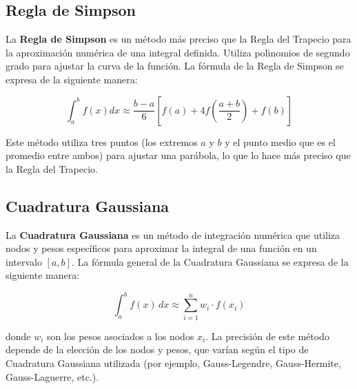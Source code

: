 \documentclass[a4paper]{article}
\begin{document}
    \subsection{Regla de Simpson}
    La \textbf{Regla de Simpson} es un método más preciso que la Regla del Trapecio para la 
    aproximación numérica de una integral definida. Utiliza polinomios de segundo grado para 
    ajustar la curva de la función. La fórmula de la Regla de Simpson se expresa de la siguiente 
    manera:
    
    \[
    \int_{a}^{b} f(x) dx \approx \frac{b-a}{6} \left[f(a) + 4f\left(\frac{a+b}{2}\right) + f(b)\right]
    \]
    
    \pagebreak
    
    Este método utiliza tres puntos (los extremos $a$ y $b$ y el punto medio que es el promedio entre ambos) para 
    ajustar una parábola, lo que lo hace más preciso que la Regla del Trapecio.\cite{srivastava2011}

    \begin{center}
    
    \end{center}

    \subsection{Cuadratura Gaussiana}
    
    La \textbf{Cuadratura Gaussiana} es un método de integración numérica que utiliza nodos y pesos 
    específicos para aproximar la integral de una función en un intervalo $[a, b]$. La fórmula 
    general de la Cuadratura Gaussiana se expresa de la siguiente manera:
    
    \[
    \int_{a}^{b} f(x) \, dx \approx \sum_{i=1}^{n} w_i \cdot f(x_i)
    \]
    
    donde $w_i$ son los pesos asociados a los nodos $x_i$. La precisión de este método depende de 
    la elección de los nodos y pesos, que varían según el tipo de Cuadratura Gaussiana utilizada 
    (por ejemplo, Gauss-Legendre, Gauss-Hermite, Gauss-Laguerre, etc.).\cite{gauss_quad}
    
\end{document}

